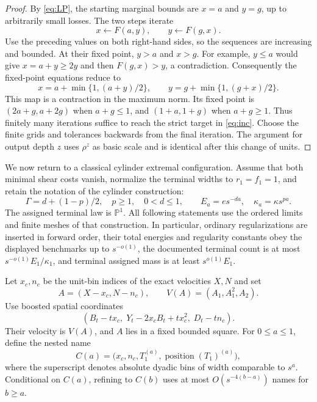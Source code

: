 \begin{proof}
By \eqref{eq:LP}, the starting marginal bounds are $x=a$ and $y=g$,
up to arbitrarily small losses. The two steps iterate
\[
 x\longleftarrow F(a,y),\qquad y\longleftarrow F(g,x).
\]
Use the preceding values on both right-hand sides, so the sequences
are increasing and bounded. At their fixed point, $y>a$ and $x>g$.
For example, $y\leq a$ would give $x=a+y\geq2y$ and then
$F(g,x)>y$, a contradiction. Consequently the fixed-point equations
reduce to
\[
 x=a+\min\{1,(a+y)/2\},\qquad
 y=g+\min\{1,(g+x)/2\}.
\]
This map is a contraction in the maximum norm. Its fixed point is
$(2a+g,a+2g)$ when $a+g\leq1$, and $(1+a,1+g)$ when $a+g\geq1$.
Thus finitely many iterations suffice to reach the strict target in
\eqref{eq:inc}. Choose the finite grids and tolerances backwards from
the final iteration. The argument for output depth $z$ uses
$\rho^z$ as basic scale and is identical after this change of units.
\end{proof}

We now return to a classical cylinder extremal configuration. Assume that
both minimal shear costs vanish, normalize the terminal widths to
$r_1=f_1=1$, and retain the notation of the cylinder construction:
\[
 \Gamma=d+(1-p)/2,\quad p\geq1,\quad 0<d\leq1,
 \qquad E_a=e s^{-da},\quad \kappa_a=\kappa s^{pa}.
\]
The assigned terminal law is $\mathbb P^1$. All following statements use
the ordered limits and finite meshes of that construction. In particular,
ordinary regularizations are inserted in forward order, their total
energies and regularity constants obey the displayed benchmarks up to
$s^{-o(1)}$, the documented terminal count is at most
$s^{-o(1)}E_1/\kappa_1$, and terminal assigned mass is at least
$s^{o(1)}E_1$.

Let $x_c,n_c$ be the unit-bin indices of the exact velocities $X,N$ and set
\[
 A=(X-x_c,N-n_c),\qquad V(A)=(A_1,A_1^2,A_2).
\]
Use boosted spatial coordinates
\[
 (B_t-tx_c,\;Y_t-2x_cB_t+tx_c^2,\;D_t-tn_c).
\]
Their velocity is $V(A)$, and $A$ lies in a fixed bounded square.
For $0\leq a\leq1$, define the nested name
\[
 C(a)=\bigl(x_c,n_c,T_1^{(a)},\operatorname{position}(T_1)^{(a)}\bigr),
\]
where the superscript denotes absolute dyadic bins of width comparable
to $s^a$. Conditional on $C(a)$, refining to $C(b)$ uses at most
$O(s^{-4(b-a)})$ names for $b\geq a$.

